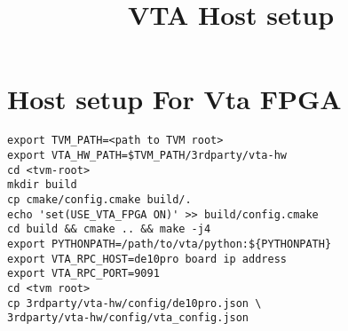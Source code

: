 \documentclass{article}
\title{VTA Host setup}
\begin{document}
\maketitle

\section{Host setup For Vta FPGA}
\begin{lstlisting}
export TVM_PATH=<path to TVM root>
export VTA_HW_PATH=$TVM_PATH/3rdparty/vta-hw
cd <tvm-root>
mkdir build
cp cmake/config.cmake build/.
echo 'set(USE_VTA_FPGA ON)' >> build/config.cmake
cd build && cmake .. && make -j4
export PYTHONPATH=/path/to/vta/python:${PYTHONPATH}
export VTA_RPC_HOST=de10pro board ip address
export VTA_RPC_PORT=9091
cd <tvm root>
cp 3rdparty/vta-hw/config/de10pro.json \
3rdparty/vta-hw/config/vta_config.json
\end{lstlisting}
\end{document}

